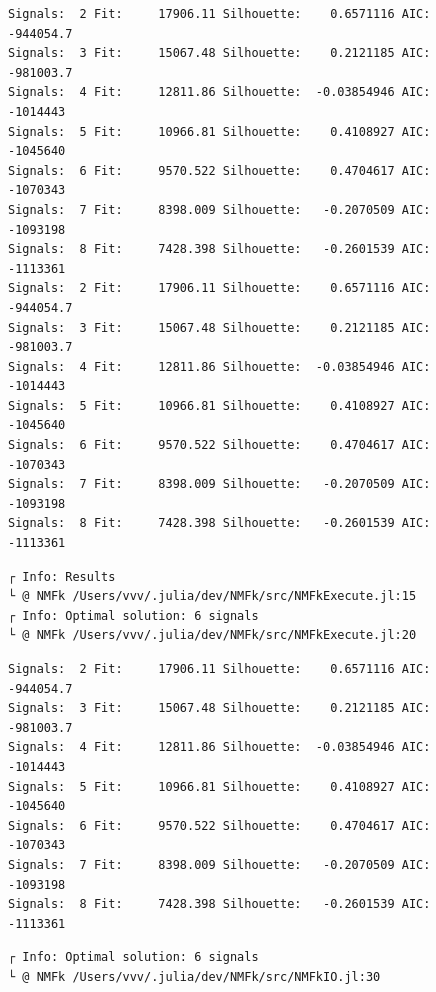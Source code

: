 \documentclass[11pt]{article}
\begin{document}
    \begin{Verbatim}[commandchars=\\\{\}]
Signals:  2 Fit:     17906.11 Silhouette:    0.6571116 AIC:    -944054.7
Signals:  3 Fit:     15067.48 Silhouette:    0.2121185 AIC:    -981003.7
Signals:  4 Fit:     12811.86 Silhouette:  -0.03854946 AIC:     -1014443
Signals:  5 Fit:     10966.81 Silhouette:    0.4108927 AIC:     -1045640
Signals:  6 Fit:     9570.522 Silhouette:    0.4704617 AIC:     -1070343
Signals:  7 Fit:     8398.009 Silhouette:   -0.2070509 AIC:     -1093198
Signals:  8 Fit:     7428.398 Silhouette:   -0.2601539 AIC:     -1113361
Signals:  2 Fit:     17906.11 Silhouette:    0.6571116 AIC:    -944054.7
Signals:  3 Fit:     15067.48 Silhouette:    0.2121185 AIC:    -981003.7
Signals:  4 Fit:     12811.86 Silhouette:  -0.03854946 AIC:     -1014443
Signals:  5 Fit:     10966.81 Silhouette:    0.4108927 AIC:     -1045640
Signals:  6 Fit:     9570.522 Silhouette:    0.4704617 AIC:     -1070343
Signals:  7 Fit:     8398.009 Silhouette:   -0.2070509 AIC:     -1093198
Signals:  8 Fit:     7428.398 Silhouette:   -0.2601539 AIC:     -1113361
    \end{Verbatim}

    \begin{Verbatim}[commandchars=\\\{\}]
┌ Info: Results
└ @ NMFk /Users/vvv/.julia/dev/NMFk/src/NMFkExecute.jl:15
┌ Info: Optimal solution: 6 signals
└ @ NMFk /Users/vvv/.julia/dev/NMFk/src/NMFkExecute.jl:20
    \end{Verbatim}

    \begin{Verbatim}[commandchars=\\\{\}]
Signals:  2 Fit:     17906.11 Silhouette:    0.6571116 AIC:    -944054.7
Signals:  3 Fit:     15067.48 Silhouette:    0.2121185 AIC:    -981003.7
Signals:  4 Fit:     12811.86 Silhouette:  -0.03854946 AIC:     -1014443
Signals:  5 Fit:     10966.81 Silhouette:    0.4108927 AIC:     -1045640
Signals:  6 Fit:     9570.522 Silhouette:    0.4704617 AIC:     -1070343
Signals:  7 Fit:     8398.009 Silhouette:   -0.2070509 AIC:     -1093198
Signals:  8 Fit:     7428.398 Silhouette:   -0.2601539 AIC:     -1113361
    \end{Verbatim}

    \begin{Verbatim}[commandchars=\\\{\}]
┌ Info: Optimal solution: 6 signals
└ @ NMFk /Users/vvv/.julia/dev/NMFk/src/NMFkIO.jl:30
    \end{Verbatim}
\end{document}
